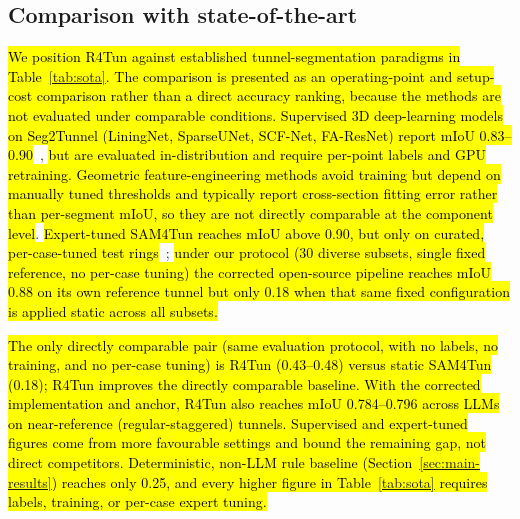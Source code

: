 \documentclass[a4paper,fleqn]{cas-dc}
\newcommand{\hlcite}[1]{\hl{\cite{#1}}}
\begin{document}
{%
\subsection{Comparison with state-of-the-art}\label{sec:positioning}

\hl{We position R4Tun against established tunnel-segmentation paradigms in Table~\ref{tab:sota}. The comparison is presented as an operating-point and setup-cost comparison rather than a direct accuracy ranking, because the methods are not evaluated under comparable conditions. Supervised 3D deep-learning models on Seg2Tunnel (LiningNet, SparseUNet, SCF-Net, FA-ResNet) report mIoU 0.83--0.90}~\hlcite{lin2024seg2tunnel}, \hl{but are evaluated in-distribution and require per-point labels and GPU retraining. Geometric feature-engineering methods avoid training but depend on manually tuned thresholds and typically report cross-section fitting error rather than per-segment mIoU, so they are not directly comparable at the component level}. \hl{Expert-tuned SAM4Tun reaches mIoU above 0.90, but only on curated, per-case-tuned test rings}~\hlcite{ye2025sam4tun}; \hl{under our protocol (30 diverse subsets, single fixed reference, no per-case tuning) the corrected open-source pipeline reaches mIoU 0.88 on its own reference tunnel but only 0.18 when that same fixed configuration is applied static across all subsets.}

\hl{The only directly comparable pair (same evaluation protocol, with no labels, no training, and no per-case tuning) is R4Tun (\mbox{0.43--0.48}) versus static SAM4Tun (0.18); R4Tun improves the directly comparable baseline. With the corrected implementation and anchor, R4Tun also reaches mIoU 0.784--0.796 across LLMs on near-reference (regular-staggered) tunnels. Supervised and expert-tuned figures come from more favourable settings and bound the remaining gap, not direct competitors. Deterministic, non-LLM rule baseline (Section~\ref{sec:main-results}) reaches only 0.25, and every higher figure in Table~\ref{tab:sota} requires labels, training, or per-case expert tuning.}

}
\end{document}
